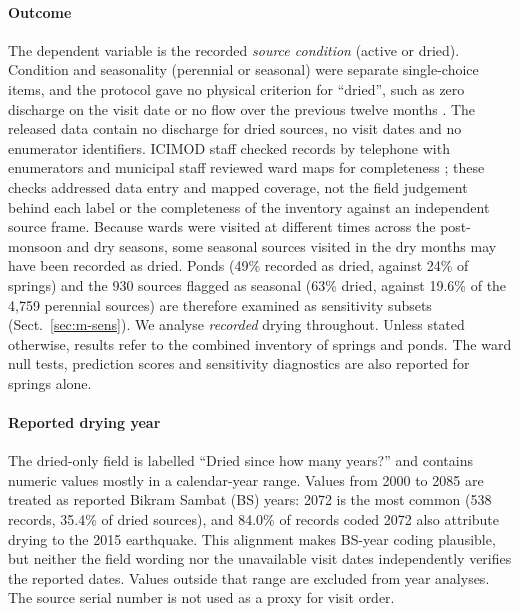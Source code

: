 \documentclass[preprint,12pt,authoryear]{elsarticle}
\begin{document}
\paragraph{Outcome} The dependent variable is the recorded \emph{source condition} (active or dried). Condition and seasonality (perennial or seasonal) were separate single-choice items, and the protocol gave no physical criterion for ``dried'', such as zero discharge on the visit date or no flow over the previous twelve months \citep{thapa2025citizen}. The released data contain no discharge for dried sources, no visit dates and no enumerator identifiers. ICIMOD staff checked records by telephone with enumerators and municipal staff reviewed ward maps for completeness \citep{thapa2025citizen}; these checks addressed data entry and mapped coverage, not the field judgement behind each label or the completeness of the inventory against an independent source frame. Because wards were visited at different times across the post-monsoon and dry seasons, some seasonal sources visited in the dry months may have been recorded as dried. Ponds (49\% recorded as dried, against 24\% of springs) and the 930 sources flagged as seasonal (63\% dried, against 19.6\% of the 4,759 perennial sources) are therefore examined as sensitivity subsets (Sect.~\ref{sec:m-sens}). We analyse \emph{recorded} drying throughout. Unless stated otherwise, results refer to the combined inventory of springs and ponds. The ward null tests, prediction scores and sensitivity diagnostics are also reported for springs alone.

\paragraph{Reported drying year} The dried-only field is labelled ``Dried since how many years?'' and contains numeric values mostly in a calendar-year range. Values from 2000 to 2085 are treated as reported Bikram Sambat (BS) years: 2072 is the most common (538 records, 35.4\% of dried sources), and 84.0\% of records coded 2072 also attribute drying to the 2015 earthquake. This alignment makes BS-year coding plausible, but neither the field wording nor the unavailable visit dates independently verifies the reported dates. Values outside that range are excluded from year analyses. The source serial number is not used as a proxy for visit order.
\end{document}
